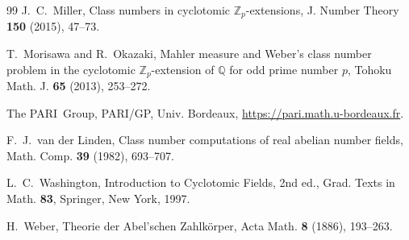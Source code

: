 \documentclass[11pt]{amsart}
\theoremstyle{plain}
\theoremstyle{definition}
\begin{document}
\begin{thebibliography}{99}
 J.~C.~Miller, Class numbers in cyclotomic $\mathbb{Z}_p$-extensions, J. Number Theory \textbf{150} (2015), 47--73.

 T.~Morisawa and R.~Okazaki, Mahler measure and Weber's class number problem in the cyclotomic $\mathbb{Z}_p$-extension of $\mathbb{Q}$ for odd prime number $p$, Tohoku Math. J. \textbf{65} (2013), 253--272.

 The PARI~Group, PARI/GP, Univ. Bordeaux, \url{https://pari.math.u-bordeaux.fr}.

 F.~J.~van der Linden, Class number computations of real abelian number fields, Math. Comp. \textbf{39} (1982), 693--707.

 L.~C.~Washington, Introduction to Cyclotomic Fields, 2nd ed., Grad. Texts in Math. \textbf{83}, Springer, New York, 1997.

 H.~Weber, Theorie der Abel'schen Zahlk\"orper, Acta Math. \textbf{8} (1886), 193--263.

\end{thebibliography}
\end{document}
